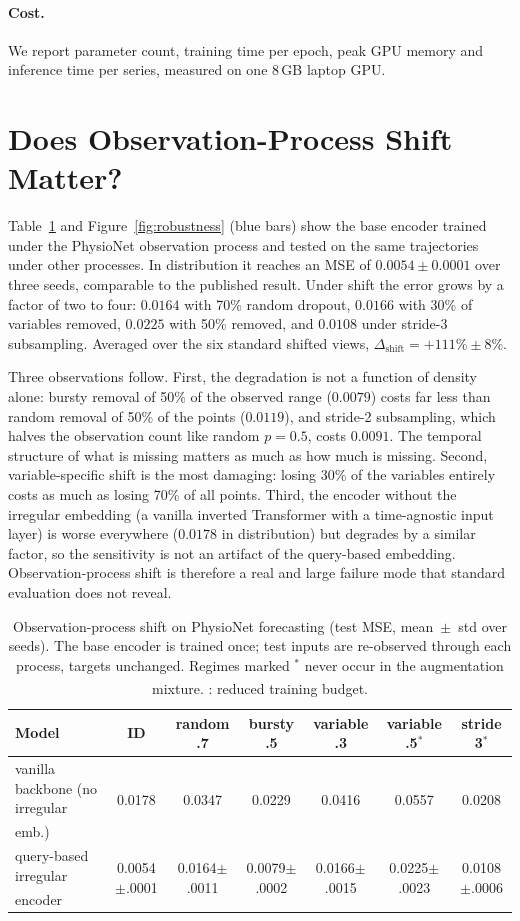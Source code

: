 \documentclass[sigconf,nonacm]{acmart}
\newcommand{\prelim}{\textsuperscript{\dag}}
\begin{document}
\paragraph{Cost.}
We report parameter count, training time per epoch, peak GPU memory and inference time per series, measured on
one 8\,GB laptop GPU.

\section{Does Observation-Process Shift Matter?}
\label{sec:phenomenon}
Table~\ref{tab:phenomenon} and Figure~\ref{fig:robustness} (blue bars) show the base encoder trained under the
PhysioNet observation process and tested on the same trajectories under other processes. In distribution it
reaches an MSE of $0.0054\pm0.0001$ over three seeds, comparable to the published result. Under shift the error
grows by a factor of two to four: $0.0164$ with 70\% random dropout, $0.0166$ with 30\% of variables removed,
$0.0225$ with 50\% removed, and $0.0108$ under stride-3 subsampling. Averaged over the six standard shifted views,
$\Delta_{\mathrm{shift}}=+111\%\pm8\%$.

Three observations follow. First, the degradation is not a function of density alone: bursty removal of 50\% of
the observed range ($0.0079$) costs far less than random removal of 50\% of the points ($0.0119$), and stride-2
subsampling, which halves the observation count like random $p=0.5$, costs $0.0091$. The temporal structure of what
is missing matters as much as how much is missing. Second, variable-specific shift is the most damaging: losing
30\% of the variables entirely costs as much as losing 70\% of all points. Third, the encoder without the
irregular embedding (a vanilla inverted Transformer with a time-agnostic input layer) is worse everywhere
($0.0178$ in distribution) but degrades by a similar factor, so the sensitivity is not an artifact of the
query-based embedding. Observation-process shift is therefore a real and large failure mode that standard
evaluation does not reveal.

\begin{table}[t]
\caption{Observation-process shift on PhysioNet forecasting (test MSE, mean~$\pm$~std over seeds). The base
encoder is trained once; test inputs are re-observed through each process, targets unchanged. Regimes marked $^*$
never occur in the augmentation mixture. \prelim: reduced training budget.}
\label{tab:phenomenon}
\small
\begin{tabular}{lcccccc}
\toprule
Model & ID & random .7 & bursty .5 & variable .3 & variable .5$^*$ & stride 3$^*$ \\
\midrule
vanilla backbone (no irregular emb.)\prelim & 0.0178 & 0.0347 & 0.0229 & 0.0416 & 0.0557 & 0.0208 \\
query-based irregular encoder\prelim & 0.0054$\pm$.0001 & 0.0164$\pm$.0011 & 0.0079$\pm$.0002 & 0.0166$\pm$.0015 & 0.0225$\pm$.0023 & 0.0108$\pm$.0006 \\
\bottomrule
\end{tabular}
\end{table}
\end{document}
